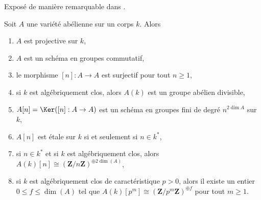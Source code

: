 \begin{proposition}
\label{proposition-review-abelian-varieties}
\begin{reference}
Exposé de manière remarquable dans \cite{AVar}.
\end{reference}
Soit $A$ une variété abélienne sur un corps $k$. Alors
\begin{enumerate}
\item $A$ est projective sur $k$,
\item $A$ est un schéma en groupes commutatif,
\item le morphisme $[n] : A \to A$ est surjectif pour tout $n \geq 1$,
\item si $k$ est algébriquement clos, alors $A(k)$ est un groupe abélien divisible,
\item $A[n] = \Ker([n] : A \to A)$ est un schéma en groupes fini de degré
$n^{2\dim A}$ sur $k$,
\item $A[n]$ est \'etale sur $k$ si et seulement si $n \in k^*$,
\item si $n \in k^*$ et si $k$ est algébriquement clos,
alors $A(k)[n] \cong (\mathbf{Z}/n\mathbf{Z})^{\oplus 2\dim(A)}$,
\item si $k$ est algébriquement clos de caractéristique $p > 0$, alors
il existe un entier $0 \leq f \leq \dim(A)$ tel que
$A(k)[p^m] \cong (\mathbf{Z}/p^m\mathbf{Z})^{\oplus f}$
pour tout $m \geq 1$.
\end{enumerate}
\end{proposition}

